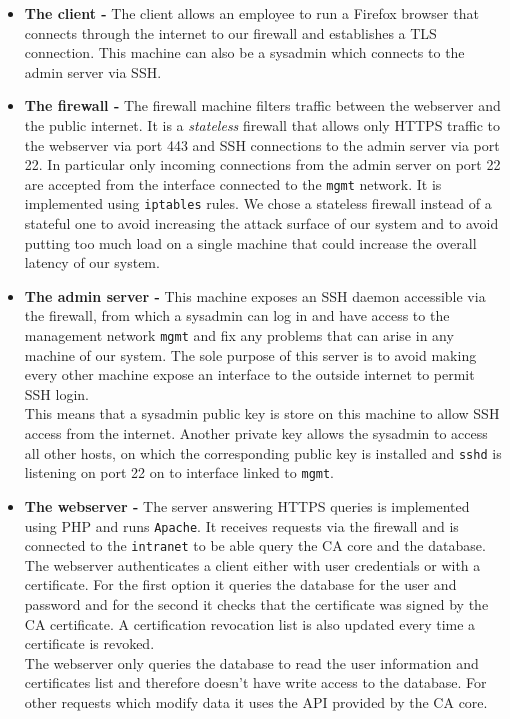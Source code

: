 \documentclass[english]{article}
\begin{document}
\begin{itemize}
	\item \textbf{The client - } The client allows an employee to run a Firefox browser that connects through the internet to our firewall and establishes a TLS connection. This machine can also be a sysadmin which connects to the admin server via SSH.
	\item \textbf{The firewall -} The firewall machine filters traffic between the webserver and the public internet. It is a \emph{stateless} firewall that allows only HTTPS traffic to the webserver via port 443 and SSH connections to the admin server via port 22. In particular only incoming connections from the admin server on port 22 are accepted from the interface connected to the \texttt{mgmt} network. It is implemented using \texttt{iptables} rules.
		We chose a stateless firewall instead of a stateful one to avoid increasing the attack surface of our system and to avoid putting too much load on a single machine that could increase the overall latency of our system.
  \item \textbf{The admin server -} This machine exposes an SSH daemon accessible via the firewall, from which a sysadmin can log in and have access to the management network \texttt{mgmt} and fix any problems that can arise in any machine of our system. The sole purpose of this server is to avoid making every other machine expose an interface to the outside internet to permit SSH login.\\
    This means that a sysadmin public key is store on this machine to allow SSH access from the internet. Another private key allows the sysadmin to access all other hosts, on which the corresponding public key is installed and \texttt{sshd} is listening on port 22 on to interface linked to \texttt{mgmt}.
	\item \textbf{The webserver -} The server answering HTTPS queries is implemented using PHP and runs \texttt{Apache}. It receives requests via the firewall and is connected to the \texttt{intranet} to be able query the CA core and the database.\\
    The webserver authenticates a client either with user credentials or with a certificate. For the first option it queries the database for the user and password and for the second it checks that the certificate was signed by the CA certificate. A certification revocation list is also updated every time a certificate is revoked.\\
    The webserver only queries the database to read the user information and certificates list and therefore doesn't have write access to the database. For other requests which modify data it uses the API provided by the CA core.


\end{itemize}
\end{document}
